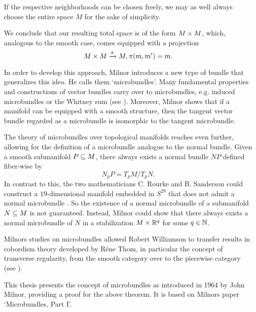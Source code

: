 \begin{myparagraph}
    If the respective neighborhoods can be chosen freely,
    we may as well always choose the entire space $M$ for the sake of simplicity.

    We conclude that our resulting total space is of the form $M \times M$, which,
    analogous to the smooth case, comes equipped with a projection
    \[ M \times M \xrightarrow{\pi} M, \pi(m, m') = m. \]
    
    In order to develop this approach, Milnor introduces a new type of bundle
    that generalizes this idea.
    He calls them `microbundles'.
    Many fundamental properties
    and constructions of vector bundles carry over to microbundles,
    e.g. induced microbundles or the Whitney sum (see ).
    Moreover, Milnor shows that if a manifold can be equipped with a smooth structure,
    then the tangent vector bundle regarded as a microbundle is isomorphic to the
    tangent microbundle.

    The theory of microbundles over topological manifolds reaches even further,
    allowing for the definition of a microbundle analogue
    to the normal bundle.
    Given a smooth submanifold $P \subseteq{} M$,
    there always exists a normal bundle $NP$ defined fiber-wise by
    \[ N_p P = T_p M / T_p N. \]
    In contrast to this, the two mathematicians C. Rourke and B. Sanderson could construct a $19$-dimensional manifold
    embedded in $S^{29}$ that does not admit a normal microbundle \cite{rourke}.
    So the existence of a normal microbundle of a submanifold $N \subseteq{} M$ is not guaranteed.
    Instead, Milnor could show that there always exists a normal microbundle
    of $N$ in a stabilization $M \times \mathbb{R}^q$ for some $q \in \mathbb{N}$.

    Milnors studies on microbundles allowed Robert Williamson
    to transfer results in cobordism theory developed by Réne Thom,
    in particular the concept of transverse regularity, from the smooth category
    over to the piecewise category (see \cite{williamson}).

    This thesis presents the concept of microbundles as introduced in 1964 by John Milnor,
    providing a proof for the above theorem.
    It is based on Milnors paper `Microbundles, Part I'.
\end{myparagraph}